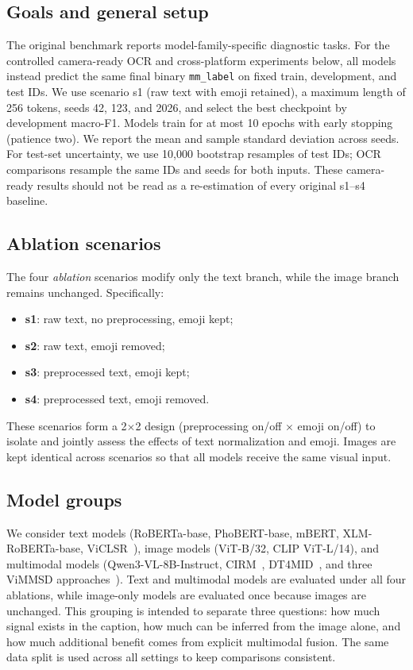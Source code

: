 \documentclass[conference]{IEEEtran}
\begin{document}
\subsection{Goals and general setup}
The original benchmark reports model-family-specific diagnostic tasks. For the controlled camera-ready OCR and cross-platform experiments below, all models instead predict the same final binary \texttt{mm\_label} on fixed train, development, and test IDs. We use scenario s1 (raw text with emoji retained), a maximum length of 256 tokens, seeds 42, 123, and 2026, and select the best checkpoint by development macro-F1. Models train for at most 10 epochs with early stopping (patience two). We report the mean and sample standard deviation across seeds. For test-set uncertainty, we use 10{,}000 bootstrap resamples of test IDs; OCR comparisons resample the same IDs and seeds for both inputs. These camera-ready results should not be read as a re-estimation of every original s1--s4 baseline.
\subsection{Ablation scenarios}
The four \textit{ablation} scenarios modify only the text branch, while the image branch remains unchanged. Specifically:
\begin{itemize}[leftmargin=1.2em]
    \item \textbf{s1}: raw text, no preprocessing, emoji kept;
    \item \textbf{s2}: raw text, emoji removed;
    \item \textbf{s3}: preprocessed text, emoji kept;
    \item \textbf{s4}: preprocessed text, emoji removed.
\end{itemize}
These scenarios form a 2$\times$2 design (preprocessing on/off $\times$ emoji on/off) to isolate and jointly assess the effects of text normalization and emoji. Images are kept identical across scenarios so that all models receive the same visual input.
\subsection{Model groups}
We consider text models (RoBERTa-base, PhoBERT-base, mBERT, XLM-RoBERTa-base, ViCLSR~\cite{huynh2026viclsr}), image models (ViT-B/32, CLIP ViT-L/14), and multimodal models (Qwen3-VL-8B-Instruct, CIRM~\cite{zhao2025mmsd3}, DT4MID~\cite{tomas_transformer-based_2023}, and three ViMMSD approaches~\cite{10.1007/978-981-96-8892-0_31}). Text and multimodal models are evaluated under all four ablations, while image-only models are evaluated once because images are unchanged.
This grouping is intended to separate three questions: how much signal exists in the caption, how much can be inferred from the image alone, and how much additional benefit comes from explicit multimodal fusion. The same data split is used across all settings to keep comparisons consistent.
\end{document}
